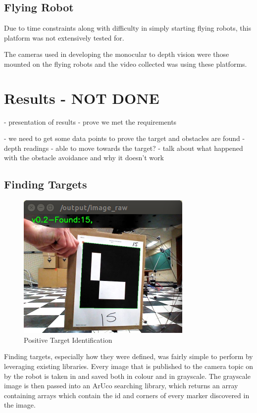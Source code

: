\documentclass{article}[12]
\begin{document}
	\subsection{Flying Robot}
	
	Due to time constraints along with difficulty in simply starting flying robots, this platform was not extensively tested for. 
	
	The cameras used in developing the monocular to depth vision were those mounted on the flying robots and the video collected was using these platforms. 

	
\section{Results - NOT DONE}

	- presentation of results
- prove we met the requirements

- we need to get some data points to prove the target and obstacles are found
- depth readings
- able to move towards the target? 
- talk about what happened with the obstacle avoidance and why it doesn't work


\subsection{Finding Targets}

\begin{figure}[H]
	\centering
	\includegraphics[width=0.45\linewidth]{resultsTarget}
	\caption{Positive Target Identification}
	\label{fig:targ}
\end{figure}

Finding targets, especially how they were defined, was fairly simple to perform by leveraging existing libraries. Every image that is published to the camera topic on by the robot is taken in and saved both in colour and in grayscale. The grayscale image is then passed into an ArUco searching library, which returns an array containing arrays which contain the id and corners of every marker discovered in the image.
\end{document}
